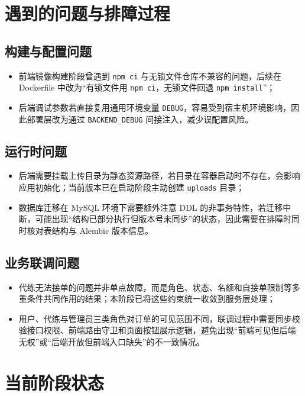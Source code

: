 ﻿\documentclass[12pt,a4paper]{ctexart}
\begin{document}
\section{遇到的问题与排障过程}

\subsection{构建与配置问题}
\begin{itemize}[leftmargin=2em]
  \item 前端镜像构建阶段曾遇到 \texttt{npm ci} 与无锁文件仓库不兼容的问题，后续在 Dockerfile 中改为“有锁文件用 \texttt{npm ci}，无锁文件回退 \texttt{npm install}”；
  \item 后端调试参数若直接复用通用环境变量 \texttt{DEBUG}，容易受到宿主机环境影响，因此部署层改为通过 \texttt{BACKEND\_DEBUG} 间接注入，减少误配置风险。
\end{itemize}

\subsection{运行时问题}
\begin{itemize}[leftmargin=2em]
  \item 后端需要挂载上传目录为静态资源路径，若目录在容器启动时不存在，会影响应用初始化；当前版本已在启动阶段主动创建 \texttt{uploads} 目录；
  \item 数据库迁移在 MySQL 环境下需要额外注意 DDL 的非事务特性，若迁移中断，可能出现“结构已部分执行但版本号未同步”的状态，因此需要在排障时同时核对表结构与 Alembic 版本信息。
\end{itemize}

\subsection{业务联调问题}
\begin{itemize}[leftmargin=2em]
  \item 代练无法接单的问题并非单点故障，而是角色、状态、名额和自接单限制等多重条件共同作用的结果；本阶段已将这些约束统一收敛到服务层处理；
  \item 用户、代练与管理员三类角色对订单的可见范围不同，联调过程中需要同步校验接口权限、前端路由守卫和页面按钮展示逻辑，避免出现“前端可见但后端无权”或“后端开放但前端入口缺失”的不一致情况。
\end{itemize}

\section{当前阶段状态}
\end{document}
